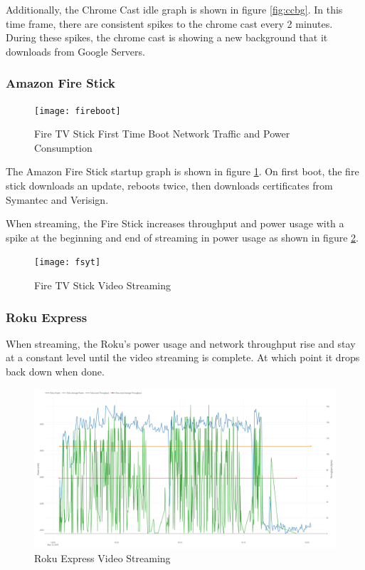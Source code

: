 Additionally, the Chrome Cast idle graph is shown in figure \ref{fig:ccbg}. In this time frame, there are consistent spikes to the chrome cast every 2 minutes. During these spikes, the chrome cast is showing a new background that it downloads from Google Servers.

\subsubsection{Amazon Fire Stick}

\begin{figure}[H]
  \centering
  \texttt{[image: fireboot]}
  \caption{Fire TV Stick First Time Boot Network Traffic and Power Consumption}
  \label{fig:fireboth}
\end{figure}

The Amazon Fire Stick startup graph is shown in figure \ref{fig:fireboth}. On first boot, the fire stick downloads an update, reboots twice, then downloads certificates from Symantec and Verisign.

When streaming, the Fire Stick increases throughput and power usage with a spike at the beginning and end of streaming in power usage as shown in figure \ref{fig:fsyt}.

\begin{figure}[H]
  \centering
  \texttt{[image: fsyt]}
  \caption{Fire TV Stick Video Streaming}
  \label{fig:fsyt}
\end{figure}

\subsubsection{Roku Express}
When streaming, the Roku's power usage and network throughput rise and stay at a constant level until the video streaming is complete. At which point it drops back down when done.

\begin{figure}[H]
  \centering
  \includegraphics[width=1\textwidth]{figures/rokuStreaming.png}
  \caption{Roku Express Video Streaming}
  \label{fig:rokuStreaming}
\end{figure}

